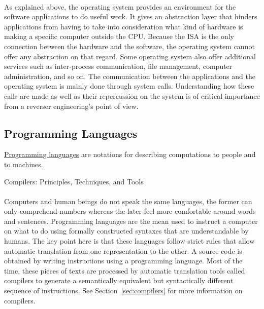 \paragraph{}
As explained above, the operating system provides an environment for the software applications to do useful work. It gives an abstraction layer that hinders applications from having to take into consideration what kind of hardware is making a specific computer outside the CPU. Because the ISA is the only connection between the hardware and the software, the operating system cannot offer any abstraction on that regard. Some operating system also offer additional services such as inter-process communication, file management, computer administration, and so on. The communication between the applications and the operating system is mainly done through system calls. Understanding how these calls are made as well as their repercussion on the system is of critical importance from a reverser engineering's point of view.

\subsection{Programming Languages} 
\begin{framed}
	\begin{definition}
		\underline{Programming languages} are notations for describing computations to people and to machines. 
		\begin{flushright}
			\hfill{}{Compilers: Principles, Techniques, and Tools~\cite{Aho:2006:CPT:1177220}}
		\end{flushright}
	\end{definition}
\end{framed}

\paragraph{}
Computers and human beings do not speak the same languages, the former can only comprehend numbers whereas the later feel more comfortable around words and sentences. Programming languages are the mean used to instruct a computer on what to do using formally constructed syntaxes that are understandable by humans. The key point here is that these languages follow strict rules that allow automatic translation from one representation to the other. A source code is obtained by writing instructions using a programming language. Most of the time, these pieces of texts are processed by automatic translation tools called compilers to generate a semantically equivalent but syntactically different sequence of instructions. See Section~\ref{sec:compilers} for more information on compilers.

